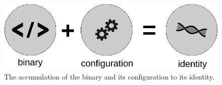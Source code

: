\begin{figure}[htpb]
  \centering
  \includegraphics[width=0.6\linewidth]{figures/ftpm-identity.pdf}
  \caption{The accumulation of the binary and its configuration to its identity.} \label{fig:ftpm-identity}
\end{figure}
